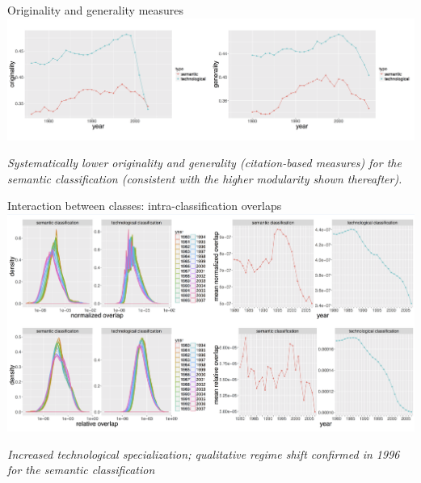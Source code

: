 \documentclass{beamer}
\begin{document}
\begin{frame}{Originality and generality measures}
   \centering
    \includegraphics[width=\textwidth]{figures/Fig6.png}
    
    \medskip
    
    \textit{Systematically lower originality and generality (citation-based measures) for the semantic classification (consistent with the higher modularity shown thereafter).}
    
\end{frame}

\begin{frame}{Interaction between classes: intra-classification overlaps}
   \centering
    \includegraphics[width=\textwidth]{figures/Fig7.png}
    
    \medskip

    
    \textit{Increased technological specialization; qualitative regime shift confirmed in 1996 for the semantic classification}
    
    
\end{frame}
\end{document}
